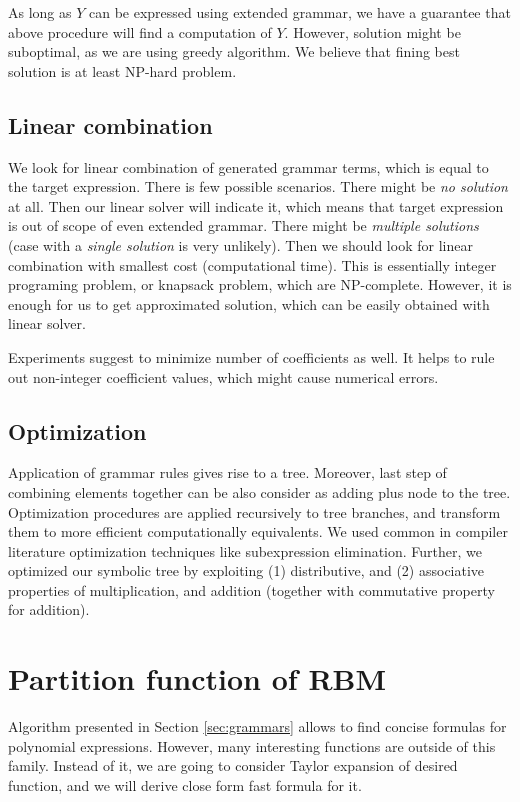 \documentclass{article}
\begin{document}
As long as $Y$ can be expressed using extended grammar, we have a guarantee that above procedure will find a computation of $Y$. However, solution might be suboptimal, as we are using
greedy algorithm. We believe that fining best solution is at least NP-hard problem. 

\subsection{Linear combination}
We look for linear combination of generated grammar terms, which is equal to the
target expression. There is few possible scenarios. There might be \emph{no solution} at all. 
Then our linear solver will indicate it, which means that target expression
is out of scope of even extended grammar. There might be \emph{multiple solutions} (case
with a \emph{single solution} is very unlikely). Then we should look for linear combination
with smallest cost (computational time). 
This is essentially integer programing problem, or knapsack problem, which 
are NP-complete. However, it is enough for us to get approximated solution, which can be easily
obtained with linear solver.


Experiments suggest to minimize number of coefficients as well. It helps to rule out
non-integer coefficient values, which might cause numerical errors. 


\subsection{Optimization}

Application of grammar rules gives rise to a tree. Moreover, last step of
combining elements together can be also consider as adding plus node to the
tree. Optimization procedures are applied recursively to tree branches, and
transform them to more efficient computationally equivalents. We used common in
compiler literature optimization techniques like subexpression elimination.
Further, we optimized our symbolic tree by exploiting (1) distributive, and (2)
associative properties of multiplication, and addition (together with
commutative property for addition).


\section{Partition function of RBM} Algorithm presented in Section
\ref{sec:grammars} allows to find concise formulas for polynomial expressions.
However, many interesting functions are outside of this family.  Instead of it,
we are going to consider Taylor expansion of desired function, and we will
derive close form fast formula for it.
\end{document}
